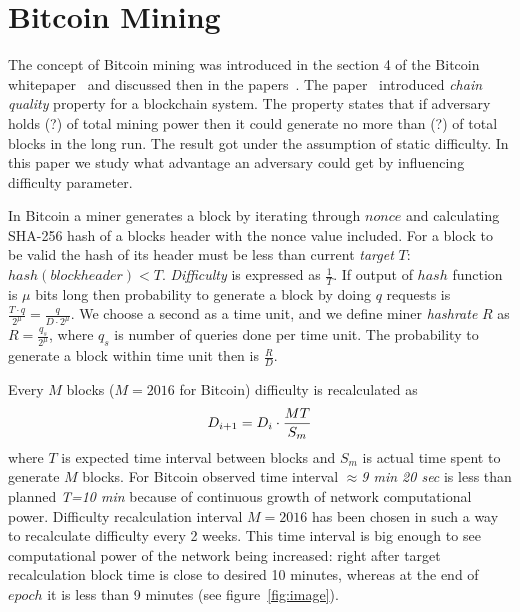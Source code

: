 \documentclass[]{llncs}
\begin{document}
\section{Bitcoin Mining}
\label{sec:bit}

The concept of Bitcoin mining was introduced in the section 4 of the Bitcoin whitepaper~\cite{Nakamoto2008} and discussed then in the papers~\cite{kraft2015difficulty, miller2014permacoin, eyal2014majority, garay2015bitcoin}. The paper~\cite{garay2015bitcoin} introduced \textit{chain quality} property for a blockchain system. The property states that if adversary holds (?) of total mining power then it could generate no more than (?) of total blocks in the long run. The result got under the assumption of static difficulty. In this paper we study what advantage an adversary could get by influencing difficulty parameter.

In Bitcoin a miner generates a block by iterating through \(nonce\) and calculating SHA-256 hash of a blocks header with the nonce value included.
For a block to be valid the hash of its header must be less than current \textit{target} \(T\): \( hash(blockheader) < T \). \textit{Difficulty} is expressed as \(\frac{1}{T}\). If output of \(hash\) function is \(\mu\) bits long then probability to generate a block by doing \(q\) requests is \(\frac{T \cdot q}{2^\mu} = \frac{q}{D \cdot 2^\mu}\). We choose a second as a time unit, and we define miner \textit{hashrate} \(R\) as \(R = \frac{q_s}{2^\mu}\), where \(q_s\) is number of queries done per time unit. The probability to generate a block within time unit then is \(\frac{R}{D}\).


Every \(M\) blocks (\(M=2016\) for Bitcoin) difficulty is recalculated as
\begin{equation}
D_{i+1}=D_i \cdot {MT\over S_m}
\end{equation}
where \(T\) is expected time interval between blocks and \(S_m\) is actual time spent to generate \(M\) blocks.
For Bitcoin observed time interval $\approx$\textit{9 min 20 sec} is less than planned \textit{T=10 min} because of continuous growth of network computational power.
Difficulty recalculation interval \(M=2016\) has been chosen in such a way to recalculate difficulty every 2 weeks.
This time interval is big enough to see computational power of the network being increased: right after target recalculation block time is close to desired 10 minutes, whereas at the end of \(epoch\) it is less than 9 minutes (see figure~\ref{fig:image}).
\end{document}
